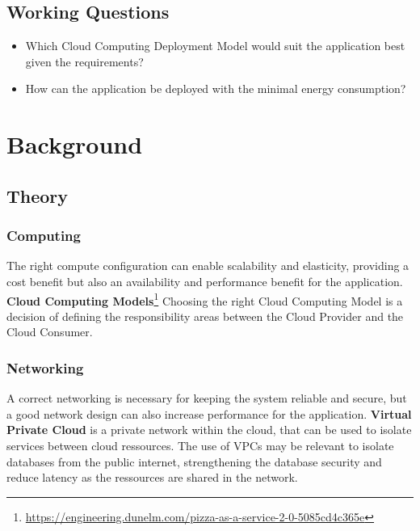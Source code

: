\documentclass[11pt]{article}
\begin{document}
\subsection{Working Questions}
\begin{itemize}
  \item Which Cloud Computing Deployment Model would suit the application best given the requirements?
  \item How can the application be deployed with the minimal energy consumption?
\end{itemize}


\section{Background}

\subsection{Theory}

\subsubsection{Computing}

The right compute configuration can enable scalability and elasticity, providing a cost benefit but also an availability and performance benefit for the application.
\newline\newline
\textbf{Cloud Computing Models}\footnote{\href{https://engineering.dunelm.com/pizza-as-a-service-2-0-5085cd4c365e}{https://engineering.dunelm.com/pizza-as-a-service-2-0-5085cd4c365e}}\newline
Choosing the right Cloud Computing Model is a decision of defining the responsibility areas between the Cloud Provider and the Cloud Consumer.


\subsubsection{Networking}

A correct networking is necessary for keeping the system reliable and secure, but a good network design can also increase performance for the application.
\newline\newline
\textbf{Virtual Private Cloud} is a private network within the cloud, that can be used to isolate services between cloud ressources. The use of VPCs may be relevant to isolate databases from the public internet, strengthening the database security and reduce latency as the ressources are shared in the network.
\end{document}
